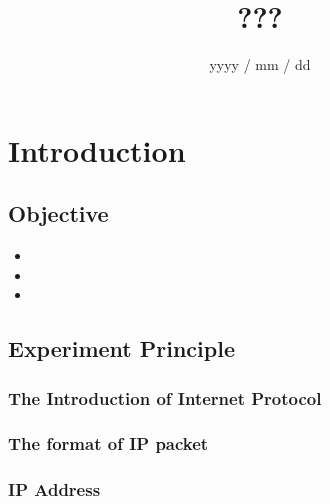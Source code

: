 \documentclass{ExpReport}
\author{} %
\title{???} %
\date{yyyy  /  mm  /  dd} %
\begin{document}
\begingroup
\renewcommand\arraystretch{1.65}
\maketitle
\endgroup


\section{Introduction}

\subsection{Objective}

\begin{itemize}
    \item 
    \item 
    \item 
\end{itemize}


\subsection{Experiment Principle}


\subsubsection{The Introduction of Internet Protocol}




\subsubsection{The format of IP packet}




\subsubsection{IP Address}
\end{document}
